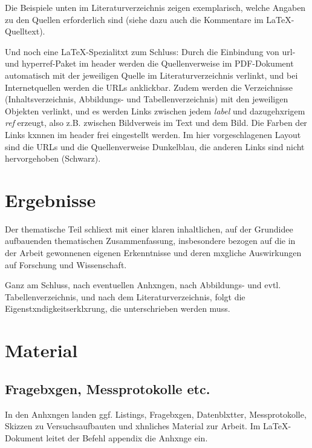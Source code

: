                 Die Beispiele unten im Literaturverzeichnis zeigen exemplarisch, welche Angaben zu den Quellen erforderlich sind (siehe dazu auch die Kommentare im \LaTeX-Quelltext). 

                Und noch eine \LaTeX-Spezialitxt zum Schluss: Durch die Einbindung von url- und hyperref-Paket im header werden die Quellenverweise im PDF-Dokument automatisch mit der jeweiligen Quelle im Literaturverzeichnis verlinkt, und bei Internetquellen werden die URLs anklickbar. Zudem werden die Verzeichnisse (Inhaltsverzeichnis, Abbildungs- und Tabellenverzeichnis) mit den jeweiligen Objekten verlinkt, und es werden Links zwischen jedem \emph{label} und  dazugehxrigem \emph{ref} erzeugt, also z.B. zwischen Bildverweis im Text und dem Bild. Die Farben der Links kxnnen im header frei eingestellt werden. Im hier vorgeschlagenen Layout sind die URLs und die Quellenverweise Dunkelblau, die anderen Links sind nicht hervorgehoben (Schwarz). 


    \chapter{Ergebnisse}

        Der thematische Teil schliext mit einer klaren inhaltlichen, auf der Grundidee aufbauenden thematischen Zusammenfassung, insbesondere bezogen auf die in der Arbeit gewonnenen eigenen Erkenntnisse und deren mxgliche Auswirkungen auf Forschung und Wissenschaft. 

        Ganz am Schluss, nach eventuellen Anhxngen, nach Abbildungs- und evtl. Tabellenverzeichnis, und nach dem Literaturverzeichnis, folgt die Eigenstxndigkeitserklxrung, die unterschrieben werden muss.

    \appendix

        \chapter{Material}

            \section{Fragebxgen, Messprotokolle etc.}

                In den Anhxngen landen ggf. Listings, Fragebxgen, Datenblxtter, Messprotokolle, Skizzen zu Versuchsaufbauten und xhnliches Material zur Arbeit. Im \LaTeX-Dokument leitet der Befehl appendix die Anhxnge ein.


        \listoffigures %
        \listoftables %


     
    

    \clearpage\thispagestyle{empty}
    \eigen  %

